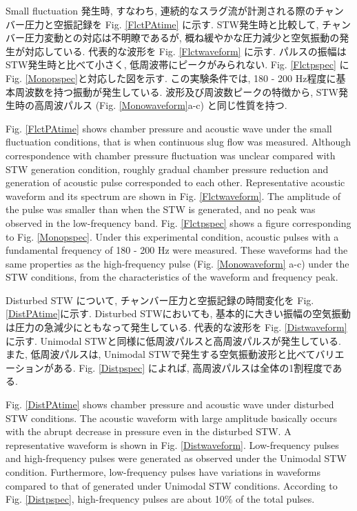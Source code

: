 \documentclass[12pt]{article}
\begin{document}
Small fluctuation 発生時, すなわち, 連続的なスラグ流が計測される際のチャンバー圧力と空振記録を Fig. \ref{FlctPAtime} に示す.  
STW発生時と比較して, チャンバー圧力変動との対応は不明瞭であるが, 概ね緩やかな圧力減少と空気振動の発生が対応している. 代表的な波形を Fig. \ref{Flctwaveform} に示す. 
パルスの振幅はSTW発生時と比べて小さく, 低周波帯にピークがみられない. 
Fig. \ref{Flctpspec} に Fig. \ref{Monopspec}と対応した図を示す. 
この実験条件では, 180 - 200 Hz程度に基本周波数を持つ振動が発生している. 
波形及び周波数ピークの特徴から, STW発生時の高周波パルス (Fig. \ref{Monowaveform}a-c) と同じ性質を持つ. 

Fig. \ref{FlctPAtime} shows chamber pressure and acoustic wave under the small fluctuation conditions, that is when continuous slug flow was measured.
Although correspondence with chamber pressure fluctuation was unclear compared with STW generation condition, roughly gradual chamber pressure reduction and generation of acoustic pulse corresponded to each other.
Representative acoustic waveform and its spectrum are shown in Fig. \ref{Flctwaveform}.
The amplitude of the pulse was smaller than when the STW is generated, and no peak was observed in the low-frequency band.
Fig. \ref{Flctpspec} shows a figure corresponding to Fig. \ref{Monopspec}.
Under this experimental condition, acoustic pulses with a fundamental frequency of 180 - 200 Hz were measured.
These waveforms had the same properties as the high-frequency pulse (Fig. \ref {Monowaveform} a-c) under the STW conditions, from the characteristics of the waveform and frequency peak.

Disturbed STW について, チャンバー圧力と空振記録の時間変化を Fig. \ref{DistPAtime}に示す. 
Disturbed STWにおいても, 基本的に大きい振幅の空気振動は圧力の急減少にともなって発生している. 
代表的な波形を Fig. \ref{Distwaveform} に示す. 
Unimodal STWと同様に低周波パルスと高周波パルスが発生している. 
また, 低周波パルスは, Unimodal STWで発生する空気振動波形と比べてバリエーションがある. Fig. \ref{Distpspec} によれば, 高周波パルスは全体の1割程度である. 

Fig. \ref {DistPAtime} shows chamber pressure and acoustic wave under disturbed STW conditions.
The acoustic waveform with large amplitude basically occurs with the abrupt decrease in pressure even in the disturbed STW.
A representative waveform is shown in Fig. \ref {Distwaveform}. 
Low-frequency pulses and high-frequency pulses were generated as observed under the Unimodal STW condition.
Furthermore, low-frequency pulses have variations in waveforms compared to that of generated under Unimodal STW conditions.
According to Fig. \ref{Distpspec}, high-frequency pulses are about 10$\%$ of the total pulses.
\end{document}
